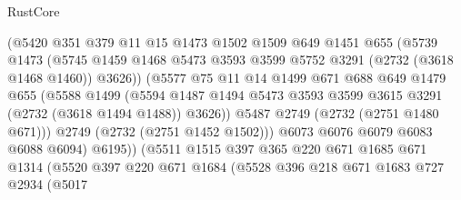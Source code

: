 \begin{lexlean}{RustCore}
\begin{coremodule}
                        (@5420
                          @351
                          @379
                          @11
                          @15
                          @1473
                          @1502
                          @1509
                          @649
                          @1451
                          @655
                          (@5739
                            @1473
                            (@5745
                              @1459
                              @1468
                              @5473
                              @3593
                              @3599
                              @5752
                              @3291
                              (@2732 (@3618 @1468 @1460))
                              @3626))
                          (@5577
                            @75
                            @11
                            @14
                            @1499
                            @671
                            @688
                            @649
                            @1479
                            @655
                            (@5588
                              @1499
                              (@5594
                                @1487
                                @1494
                                @5473
                                @3593
                                @3599
                                @3615
                                @3291
                                (@2732 (@3618 @1494 @1488))
                                @3626))
                            @5487
                            @2749
                            (@2732 (@2751 @1480 @671)))
                          @2749
                          (@2732 (@2751 @1452 @1502)))
                        @6073
                        @6076
                        @6079
                        @6083
                        @6088
                        @6094)
                      @6195))
                  (@5511
                    @1515
                    @397
                    @365
                    @220
                    @671
                    @1685
                    @671
                    @1314
                    (@5520
                      @397
                      @220
                      @671
                      @1684
                      (@5528
                        @396
                        @218
                        @671
                        @1683
                        @727
                        @2934
                        (@5017

\end{coremodule}
\end{lexlean}
